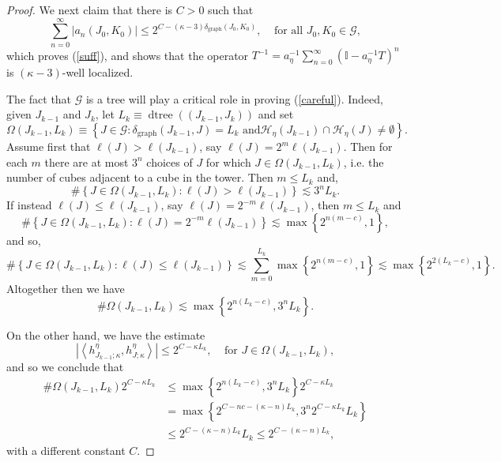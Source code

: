 \documentclass[10pt,a4paper]{amsart}
\begin{document}
\begin{proof}
We next claim that there is $C>0$ such that
\begin{equation}
\sum_{n=0}^{\infty}\left\vert a_{n}\left(  J_{0},K_{0}\right)  \right\vert
\leq2^{C-\left(  \kappa-3\right)  \delta_{\operatorname*{graph}}\left(
J_{0},K_{0}\right)  },\ \ \ \ \ \text{for all }J_{0},K_{0}\in\mathcal{G}%
,\label{careful}%
\end{equation}
which proves (\ref{suff}), and shows that the operator $T^{-1}=a_{\eta}%
^{-1}\sum_{n=0}^{\infty}\left(  \mathbb{I}-a_{\eta}^{-1}T\right)  ^{n}$ is
$\left(  \kappa-3\right)  $-well localized.

The fact that $\mathcal{G}$ is a tree will play a critical role in proving
(\ref{careful}). Indeed, given $J_{k-1}$ and $J_{k}$, let $L_{k}%
\equiv\operatorname*{dtree}\left(  \left(  J_{k-1},J_{k}\right)  \right)  $
and set%
\[
\Omega\left(  J_{k-1},L_{k}\right)  \equiv\left\{  J\in\mathcal{G}%
:\delta_{\operatorname*{graph}}\left(  J_{k-1},J\right)  =L_{k}\text{ and
}\mathcal{H}_{\eta}\left(  J_{k-1}\right)  \cap\mathcal{H}_{\eta}\left(
J\right)  \neq\emptyset\right\}  .
\]
Assume first that $\ell\left(  J\right)  >\ell\left(  J_{k-1}\right)  $, say
$\ell\left(  J\right)  =2^{m}\ell\left(  J_{k-1}\right)  $. Then for each $m$
there are at most $3^{n}$ choices of $J$ for which $J\in\Omega\left(
J_{k-1},L_{k}\right)  $, i.e. the number of cubes adjacent to a cube in the
tower. Then $m\leq L_{k}$ and,%
\[
\#\left\{  J\in\Omega\left(  J_{k-1},L_{k}\right)  :\ell\left(  J\right)
>\ell\left(  J_{k-1}\right)  \right\}  \lesssim3^{n}L_{k}.
\]
If instead $\ell\left(  J\right)  \leq\ell\left(  J_{k-1}\right)  $, say
$\ell\left(  J\right)  =2^{-m}\ell\left(  J_{k-1}\right)  $, then $m\leq
L_{k}$ and
\[
\#\left\{  J\in\Omega\left(  J_{k-1},L_{k}\right)  :\ell\left(  J\right)
=2^{-m}\ell\left(  J_{k-1}\right)  \right\}  \lesssim\max\left\{  2^{n\left(
m-c\right)  },1\right\}  ,
\]
and so,%
\[
\#\left\{  J\in\Omega\left(  J_{k-1},L_{k}\right)  :\ell\left(  J\right)
\leq\ell\left(  J_{k-1}\right)  \right\}  \lesssim\sum_{m=0}^{L_{k}}%
\max\left\{  2^{n\left(  m-c\right)  },1\right\}  \lesssim\max\left\{
2^{2\left(  L_{k}-c\right)  },1\right\}  .
\]
Altogether then we have%
\[
\#\Omega\left(  J_{k-1},L_{k}\right)  \lesssim\max\left\{  2^{n\left(
L_{k}-c\right)  },3^{n}L_{k}\right\}  .
\]


On the other hand, we have the estimate%
\[
\left\vert \left\langle h_{J_{k-1};\kappa}^{\eta},h_{J;\kappa}^{\eta
}\right\rangle \right\vert \leq2^{C-\kappa L_{k}},\ \ \ \ \ \text{for }%
J\in\Omega\left(  J_{k-1},L_{k}\right)  ,
\]
and so we conclude that
\begin{align*}
\#\Omega\left(  J_{k-1},L_{k}\right)  2^{C-\kappa L_{k}}  & \leq\max\left\{
2^{n\left(  L_{k}-c\right)  },3^{n}L_{k}\right\}  2^{C-\kappa L_{k}}\\
& =\max\left\{  2^{C-nc-\left(  \kappa-n\right)  L_{k}},3^{n}2^{C-\kappa
L_{k}}L_{k}\right\}  \\
& \leq2^{C-\left(  \kappa-n\right)  L_{k}}L_{k}\leq2^{C-\left(  \kappa
-n\right)  L_{k}},
\end{align*}
with a different constant $C$.


\end{proof}
\end{document}
